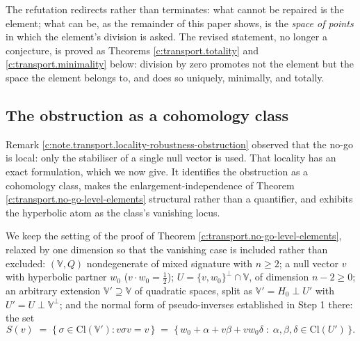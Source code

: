 \documentclass[11pt]{article}
\theoremstyle{definition}
\theoremstyle{plain}
\providecommand{\Cl}{}\renewcommand{\Cl}{\mathrm{Cl}}
\begin{document}
\label{c:note.transport.setting-refuted-conjecture-no-go-3}
The refutation redirects rather than terminates: what cannot be repaired is the element; what can be, as the remainder of this paper shows, is the \emph{space of points} in which the element's division is asked. The revised statement, no longer a conjecture, is proved as Theorems \ref{c:transport.totality} and \ref{c:transport.minimality} below: division by zero promotes not the element but the space the element belongs to, and does so uniquely, minimally, and totally.

\subsection*{The obstruction as a cohomology class}
\label{c:note.transport.setting-obstruction-cohomology-class}
Remark \ref{c:note.transport.locality-robustness-obstruction} observed that the no-go is local: only the stabiliser of a single null vector is used. That locality has an exact formulation, which we now give. It identifies the obstruction as a cohomology class, makes the enlargement-independence of Theorem \ref{c:transport.no-go-level-elements} structural rather than a quantifier, and exhibits the hyperbolic atom as the class's vanishing locus.

We keep the setting of the proof of Theorem \ref{c:transport.no-go-level-elements}, relaxed by one dimension so that the vanishing case is included rather than excluded: $(\mathbb{V}, Q)$ nondegenerate of mixed signature with $n \geq 2$; a null vector $v$ with hyperbolic partner $w_0$ ($v \cdot w_0 = \tfrac12$); $U = \{v, w_0\}^\perp \cap \mathbb{V}$, of dimension $n - 2 \geq 0$; an arbitrary extension $\mathbb{V}' \supseteq \mathbb{V}$ of quadratic spaces, split as $\mathbb{V}' = H_0 \perp U'$ with $U' = U \perp \mathbb{V}^\perp$; and the normal form of pseudo-inverses established in Step 1 there: the set
\[
S(v) \;=\; \{\, \sigma \in \Cl(\mathbb{V}') : v\sigma v = v \,\}
\;=\; \{\, w_0 + \alpha + v\beta + vw_0\delta \;:\; \alpha, \beta, \delta \in \Cl(U') \,\}.
\]
\end{document}
